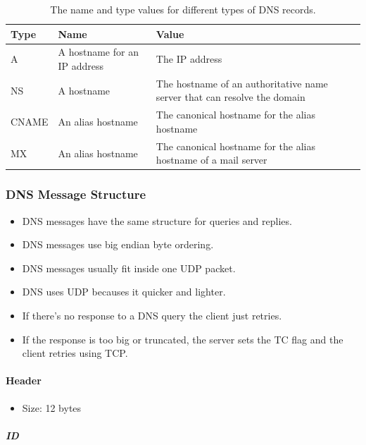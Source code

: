 \documentclass{article}
\begin{document}
\begin{table}
    \centering
    \begin{tabular}{|l|p{3cm}|p{6cm}|}
        \hline
        \textbf{Type} & \textbf{Name} & \textbf{Value} \\ \hline
        A & A hostname for an IP address & The IP address \\ \hline
        NS & A hostname & The hostname of an authoritative name server that can resolve the domain \\ \hline
        CNAME & An alias hostname & The canonical hostname for the alias hostname \\ \hline
        MX & An alias hostname & The canonical hostname for the alias hostname of a mail server \\ \hline
    \end{tabular}
    \caption{The name and type values for different types of DNS records.}

\end{table}

\subsubsection{DNS Message Structure}

\begin{itemize}
    \item DNS messages have the same structure for queries and replies.
    \item DNS messages use big endian byte ordering.
    \item DNS messages usually fit inside one UDP packet.
    \item DNS uses UDP becauses it quicker and lighter.
    \item If there's no response to a DNS query the client just retries.
    \item If the response is too big or truncated, the server sets the TC flag and the client retries using TCP.
\end{itemize}

\paragraph{Header}

\begin{itemize}
    \item Size: 12 bytes
\end{itemize}

\subparagraph{ID}
\end{document}
